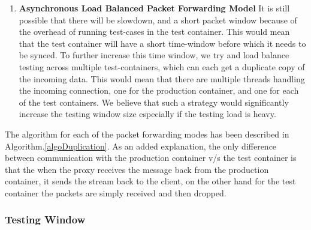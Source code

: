 \begin{enumerate}
  \item \textbf{Asynchronous Load Balanced Packet Forwarding Model}
It is still possible that there will be slowdown, and a short packet window because of the overhead of running test-cases in the test container. 
This would mean that the test container will have a short time-window before which it needs to be synced.
To further increase this time window, we try and load balance testing across multiple test-containers, which can each get a duplicate copy of the incoming data. 
This would mean that there are multiple threads handling the incoming connection, one for the production container, and one for each of the test containers.
We believe that such a strategy would significantly increase the testing window size especially if the testing load is heavy.

\end{enumerate}

The algorithm for each of the packet forwarding modes has been described in Algorithm.\ref{algoDuplication}. 
As an added explanation, the only difference between communication with the production container v/s the test container is that the when the proxy receives the message back from the production container, it sends the stream back to the client, on the other hand for the test container the packets are simply received and then dropped.

\subsubsection{Testing Window}
\label{sec:testingWindow}

